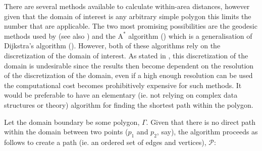 There are several methods available to calculate within-area distances, however given that the domain of interest is any arbitrary simple polygon this limits the number that are applicable. The two most promising possibilities are the geodesic methods used by \cite{wangranalli} (see also ) and the $\text{A}^*$ algorithm (\cite{astarpaper}) which is a generalisation of Dijkstra's algorithm (\cite{dijkstra}). However, both of these algorithms rely on the discretization of the domain of interest. As stated in , this discretization of the domain is undesirable since the results then become dependent on the resolution of the discretization of the domain, even if a high enough resolution can be used the computational cost becomes prohibitively expensive for such methods. It would be preferable to have an elementary (ie. not relying on complex data structures or theory) algorithm for finding the shortest path within the polygon.

Let the domain boundary be some polygon, $\Gamma$. Given that there is no direct path within the domain between two points ($p_1$ and $p_2$, say), the algorithm proceeds as follows to create a path (ie. an ordered set of edges and vertices), $\mathcal{P}$:

